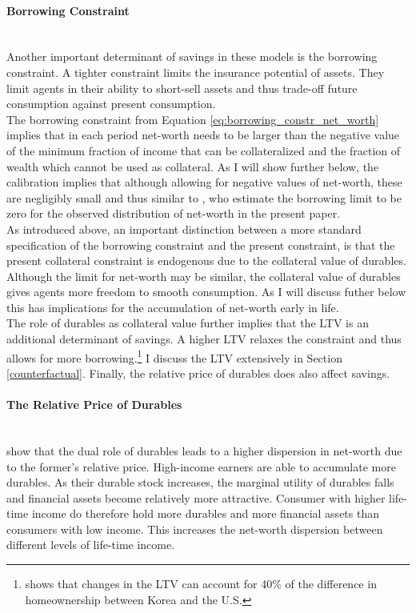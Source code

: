 \documentclass[a4paper,12pt,legno]{article}
\newcommand{\myparagraph}[1]{\paragraph{#1}\mbox{}\\}
\begin{document}
\myparagraph{Borrowing Constraint} Another important determinant of savings in these models is the borrowing constraint. A tighter constraint limits the insurance potential of assets. They limit agents in their ability to short-sell assets and thus trade-off future consumption against present consumption. \\ 
The borrowing constraint from Equation \ref{eq:borrowing_constr_net_worth} implies that in each period net-worth needs to be larger than the negative value of the minimum fraction of income that can be collateralized and the fraction of wealth which cannot be used as collateral. As I will show further below, the calibration implies that although allowing for negative values of net-worth, these are negligibly small and thus similar to \cite{hintermaier2011}, who estimate the borrowing limit to be zero for the observed distribution of net-worth in the present paper. 
\\ 
As introduced above, an important distinction between a more standard specification of the borrowing constraint and the present constraint, is that the present collateral constraint is endogenous due to the collateral value of durables. Although the limit for net-worth may be similar, the collateral value of durables gives agents more freedom to smooth consumption. As I will discuss futher below this has implications for the accumulation of net-worth early in life.\\ The role of durables as collateral value further implies that the LTV is an additional determinant of savings. A higher LTV relaxes the constraint and thus allows for more borrowing.\footnote{\cite{cho2012accounting} shows that changes in the LTV can account for 40\% of the difference in homeownership between Korea and the U.S.} I discuss the LTV extensively in Section \ref{counterfactual}.
Finally, the relative price of durables does also affect savings.

\myparagraph{The Relative Price of Durables} \cite{FV&K2011} show that the dual role of durables leads to a higher dispersion in net-worth due to the former's relative price. High-income earners are able to accumulate more durables. As their durable stock increases, the marginal utility of durables falls and financial assets become relatively more attractive. Consumer with higher life-time income do therefore hold more durables and more financial assets than consumers with low income. This increases the net-worth dispersion between different levels of life-time income. 
\end{document}
